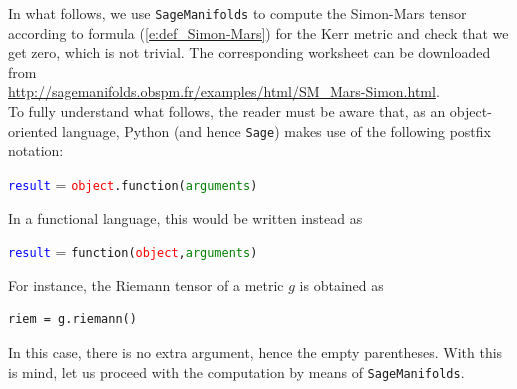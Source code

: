 \documentclass[a4paper]{jpconf}
\newcommand{\soft}[1]{\texttt{#1}}
\newcommand{\Sage}{\soft{Sage}}
\newcommand{\SM}{\soft{SageManifolds}}
\begin{document}
In what follows, we use \SM{} to compute the Simon-Mars tensor 
according to formula (\ref{e:def_Simon-Mars}) for the Kerr metric and check 
that we get zero, which is not trivial. 
The corresponding worksheet can be downloaded from \\
\url{http://sagemanifolds.obspm.fr/examples/html/SM_Mars-Simon.html}.\\
To fully understand what follows, the reader must be aware that, 
as an object-oriented language, Python (and hence \Sage{}) makes use of 
the following postfix notation:
\begin{center}
\textcolor{blue}{\texttt{result}} = \textcolor{red}{\texttt{object}}\texttt{.}\texttt{function(}\textcolor{green}{\texttt{arguments}}\texttt{)}
\end{center}
In a functional language, this would be written instead as
 \begin{center}
\textcolor{blue}{\texttt{result}} = \texttt{function(}\textcolor{red}{\texttt{object}}\texttt{,}\textcolor{green}{\texttt{arguments}}\texttt{)}
\end{center}
For instance, the Riemann tensor of a metric $g$ is obtained as 
\begin{verbatim}
riem = g.riemann()
\end{verbatim}
In this case, there is no extra argument, hence the empty parentheses. 
With this is mind, let us proceed with the computation by means of 
\SM{}. 
\end{document}
